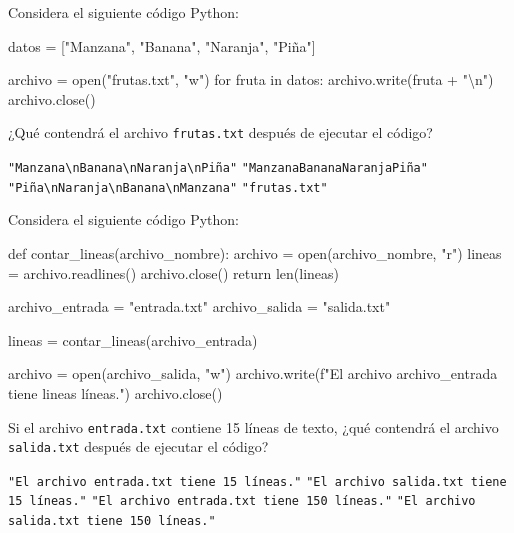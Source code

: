 \begin{ejercicio}
Considera el siguiente código Python:

\begin{python}
datos = ["Manzana", "Banana", "Naranja", "Piña"]

archivo = open("frutas.txt", "w")
for fruta in datos:
    archivo.write(fruta + "\textbackslash n")
archivo.close()
\end{python}

¿Qué contendrá el archivo \texttt{frutas.txt} después de ejecutar el código?

\begin{choices}
    \choice \texttt{"Manzana\textbackslash nBanana\textbackslash nNaranja\textbackslash nPiña"}
    \choice \texttt{"ManzanaBananaNaranjaPiña"}
    \choice \texttt{"Piña\textbackslash nNaranja\textbackslash nBanana\textbackslash nManzana"}
    \choice \texttt{"frutas.txt"}
\end{choices}

\end{ejercicio}

\begin{ejercicio}
Considera el siguiente código Python:

\begin{python}
def contar_lineas(archivo_nombre):
    archivo = open(archivo_nombre, "r")
    lineas = archivo.readlines()
    archivo.close()
    return len(lineas)

archivo_entrada = "entrada.txt"
archivo_salida = "salida.txt"

lineas = contar_lineas(archivo_entrada)

archivo = open(archivo_salida, "w")
archivo.write(f"El archivo {archivo_entrada} tiene {lineas} líneas.")
archivo.close()
\end{python}

Si el archivo \texttt{entrada.txt} contiene 15 líneas de texto, ¿qué contendrá el archivo \texttt{salida.txt} después de ejecutar el código?

\begin{choices}
    \choice \texttt{"El archivo entrada.txt tiene 15 líneas."}
    \choice \texttt{"El archivo salida.txt tiene 15 líneas."}
    \choice \texttt{"El archivo entrada.txt tiene 150 líneas."}
    \choice \texttt{"El archivo salida.txt tiene 150 líneas."}
\end{choices}

\end{ejercicio}






